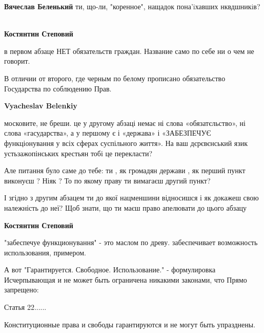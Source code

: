 \begin{itemize}
\begin{itemize}
\textbf{Вячеслав Беленький} ти, що-ли, "коренное", нащадок пона'iхавших нквдшникiв? 🤔

 
\textbf{Костянтин Степовий}

в первом абзаце НЕТ обязательств граждан. Название само по себе ни о чем не
говорит.

В отличии от второго, где черным по белому прописано обязательство Государства
по соблюдению Прав.

 
\textbf{Vyacheslav Belenkiy} 

московите, не бреши. це у другому абзаці немає ні слова «обязатєльство», ні
слова «гасударства», а у першому є і «держава» і «ЗАБЕЗПЕЧУЄ функціонування у
всіх сферах суспільного життя». На ваш дєрєвєнський язик устьзажопінських
крестьян тобі це перекласти? 🧐

Але питання було саме до тебе: ти , як громадян держави , як перший пункт
виконуєш ? Ніяк ? То по якому праву ти вимагаєш другий пункт?

І згідно з другим абзацем ти до якої нацменшини відносишся і як докажеш свою
належність до неї? Щоб знати, що ти маєш право апелювати до цього абзацу

 
\textbf{Костянтин Степовий}

"забеспечуе функционування" - это маслом по древу. забеспечивает возможность
использования, примером.

А вот "Гарантируется. Свободное. Использование." - формулировка Исчерпывающая и
не может быть ограничена никакими законами, что Прямо запрещено:

Статья 22......

Конституционные права и свободы гарантируются и не могут быть упразднены.


\end{itemize}
\end{itemize}
